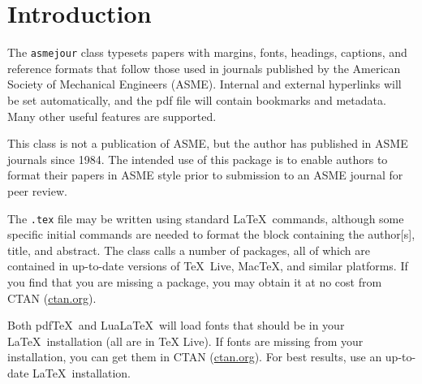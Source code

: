 \documentclass[balance,nocopyright,upint,varvw,hyphenate,barcolor=Goldenrod3,german]{asmejour}%
\newcommand*\pdfTeX{pdf\TeX}
\newcommand*\LuaLaTeX{Lua\LaTeX}
\begin{document}
\date{Version \versionno, \today}%

\maketitle %



\section{Introduction}

The \texttt{asmejour} class typesets papers with margins, fonts, headings, captions, and reference formats that follow those used in journals published by the American Society of Mechanical Engineers (ASME). Internal and external hyperlinks will be set automatically, and the pdf file will contain bookmarks and metadata. Many other useful features are supported.

This class is not a publication of ASME, but the author has published in ASME journals since 1984. The intended use of this package is to enable authors to format their papers in ASME style prior to submission to an ASME journal for peer review.

The \texttt{.tex} file may be written using standard \LaTeX\ commands, although some specific initial commands are needed to format the block containing the author[s], title, and abstract. The class calls a number of packages, all of which are contained in up-to-date versions of \TeX~Live, Mac\TeX, and similar platforms. If you find that you are missing a package, you may obtain it at no cost from CTAN (\href{http://ctan.org}{ctan.org}).

Both \pdfTeX\ and \LuaLaTeX\ will load fonts that should be in your \LaTeX\ installation (all are in TeX Live).  If fonts are missing from your installation, you can get them in CTAN (\href{http://ctan.org}{ctan.org}).  For best results, use an up-to-date \LaTeX\ installation.
\end{document}
